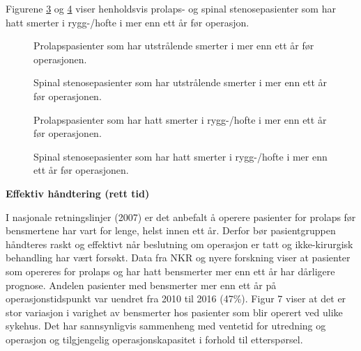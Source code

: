 \documentclass [norsk,a4paper,twoside]{article}\usepackage[]{graphicx}\usepackage[]{color}
\begin{document}
Figurene \ref{fig:VarighSmerteRyggAvdPro} og \ref{fig:VarighSmerteRyggAvdSS} viser henholdsvis prolaps- og spinal stenosepasienter som har hatt smerter i rygg-/hofte i mer enn ett år før operasjon.

\begin{figure}[h] 
  \caption{Prolapspasienter som har utstrålende smerter
			i mer enn ett år før operasjonen.}
  \label{fig:VarighSmerteUtstrAvdPro}
\end{figure}
\begin{figure}[h] 
  \caption{Spinal stenosepasienter som har utstrålende smerter
			i mer enn ett år før operasjonen.}
  \label{fig:VarighSmerteUtstrAvdSS}
\end{figure}

\begin{figure}[h] 
  \caption{Prolapspasienter som har hatt smerter i rygg-/hofte
			i mer enn ett år før operasjonen.}
  \label{fig:VarighSmerteRyggAvdPro}
\end{figure}
\begin{figure}[h] 
  \caption{Spinal stenosepasienter som har hatt smerter i rygg-/hofte
			i mer enn ett år før operasjonen.}
  \label{fig:VarighSmerteRyggAvdSS}
\end{figure}


\textbf{Effektiv håndtering (rett tid)}

I nasjonale retningslinjer (2007) er det anbefalt å operere pasienter for prolaps før
bensmertene har vart for lenge, helst innen ett år. Derfor bør
pasientgruppen håndteres raskt og effektivt når beslutning om operasjon er tatt og
ikke-kirurgisk behandling har vært forsøkt. Data fra NKR og nyere forskning viser at
pasienter som opereres for prolaps og har hatt bensmerter mer enn ett år har
dårligere prognose. Andelen pasienter med bensmerter mer enn ett år på
operasjonstidspunkt var uendret fra 2010 til 2016 (47\%).
Figur 7 viser at det er stor variasjon i varighet av bensmerter hos pasienter som blir
operert ved ulike sykehus. Det har sannsynligvis sammenheng med ventetid for
utredning og operasjon og tilgjengelig operasjonskapasitet i forhold til etterspørsel.


\clearpage
\end{document}
